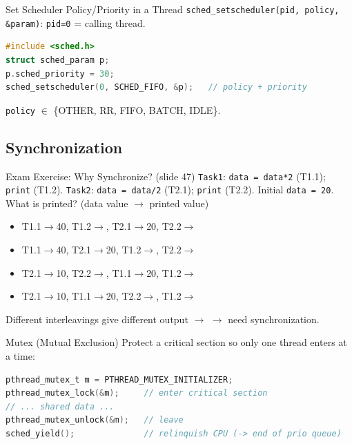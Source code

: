 \begin{KR}{Set Scheduler Policy/Priority in a Thread}
    \texttt{sched\_setscheduler(pid, policy, \&param)}: \texttt{pid=0} = calling thread.
\begin{lstlisting}[language=C, style=basesmol, aboveskip=2pt, belowskip=2pt]
#include <sched.h>
struct sched_param p;
p.sched_priority = 30;
sched_setscheduler(0, SCHED_FIFO, &p);   // policy + priority
\end{lstlisting}
    \texttt{policy} $\in$ \{OTHER, RR, FIFO, BATCH, IDLE\}.
\end{KR}

\subsection{Synchronization}

\begin{example2}{Exam Exercise: Why Synchronize? (slide 47)}
    \texttt{Task1}: \texttt{data = data*2} (T1.1); \texttt{print} (T1.2).
    \texttt{Task2}: \texttt{data = data/2} (T2.1); \texttt{print} (T2.2).
    Initial \texttt{data = 20}. What is printed? (data value $\to$ printed value)
    \tcblower
    \begin{itemize}
        \item T1.1$\to$40, T1.2$\to$, T2.1$\to$20, T2.2$\to$
        \item T1.1$\to$40, T2.1$\to$20, T1.2$\to$, T2.2$\to$
        \item T2.1$\to$10, T2.2$\to$, T1.1$\to$20, T1.2$\to$
        \item T2.1$\to$10, T1.1$\to$20, T2.2$\to$, T1.2$\to$
    \end{itemize}
    Different interleavings give different output $\to$ 
    $\to$ need synchronization.
\end{example2}

\begin{KR}{Mutex (Mutual Exclusion)}
    Protect a critical section so only one thread enters at a time:
\begin{lstlisting}[language=C, style=basesmol, aboveskip=2pt, belowskip=2pt]
pthread_mutex_t m = PTHREAD_MUTEX_INITIALIZER;
pthread_mutex_lock(&m);     // enter critical section
// ... shared data ...
pthread_mutex_unlock(&m);   // leave
sched_yield();              // relinquish CPU (-> end of prio queue)
\end{lstlisting}
\end{KR}

